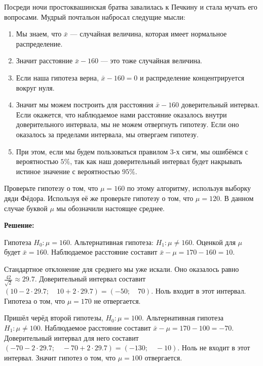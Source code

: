 \documentclass[12pt, a4paper, oneside]{article}
\begin{document}
Посреди ночи простоквашинская братва завалилась к Печкину и стала мучать его вопросами. Мудрый почтальон набросал следущие мысли: 

\begin{enumerate} 
	\item  Мы знаем, что $\bar x $ --- случайная величина, которая имеет нормальное распределение.
	
	\item Значит расстояние  $\bar x - 160$ --- это тоже случайная величина.
	
	\item Если наша гипотеза верна, $\bar x - 160 = 0$  и распределение концентрируется вокруг нуля. 
	
	\item Значит мы можем построить для расстояния $\bar x - 160$ доверительный интервал. Если окажется,  что наблюдаемое нами расстояние оказалось внутри доверительного интервала, мы не можем отвергнуть гипотезу. Если оно оказалось за пределами интервала, мы отвергаем гипотезу. 
	
	\item При этом, если мы будем пользоваться правилом $3$-х сигм, мы ошибёмся с вероятностью $5\%$, так как наш доверительный интервал будет накрывать истиное значение с вероятностью $95\%$. 
\end{enumerate}

Проверьте гипотезу о том, что $\mu = 160$ по этому алгоритму, используя выборку дяди Фёдора. Используя её же проверьте гипотезу о том, что  $\mu = 120$. В данном случае буквой $\mu$ мы обозначили настоящее среднее. 

\textbf{Решение:}

Гипотеза $H_0:  \mu = 160.$  Альтернативная гипотеза: $H_1: \mu \ne 160$. Оценкой для $\mu$ будет $\bar x = 160$.  Наблюдаемое расстояние составит $\bar x - \mu = 170 - 160 = 10$. 

Стандартное отклонение для среднего мы уже искали. Оно оказалось равно $\frac{42}{\sqrt{2}} \approx 29.7$. Доверительный интервал составит $(10 - 2 \cdot 29.7; \quad  10+ 2 \cdot 29.7) = (-50; \quad  70)$.  Ноль входит в этот интервал. Гипотеза о том, что $\mu = 170$ не отвергается. 

Пришёл черёд второй гипотезы, $H_0: \mu = 100.$ Альтернативная гипотеза $H_1: \mu \ne 100$. Наблюдаемое расстояние составит $\bar x - \mu = 170 - 100 = -70$.  Доверительный интервал для него составит $(-70 - 2 \cdot 29.7; \quad -70 + 2 \cdot 29.7) = (-130; \quad -10)$. Ноль не входит в этот интервал. Значит гипотез о том, что $\mu = 100$ отвергается. 
\end{document}
